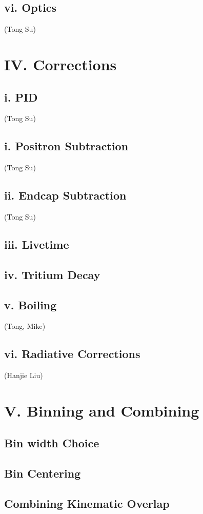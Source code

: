 \documentclass[letterpaper,aps,prl,superscriptaddress,floatfix,twocolumn]{revtex4}
\begin{document}
 \subsection{vi. Optics}
 (Tong Su)
 

\section{IV. Corrections}

 \subsection{i. PID}
 (Tong Su)
 

 \subsection{i. Positron Subtraction}
  (Tong Su)




 \subsection{ii. Endcap Subtraction}
 (Tong Su)

 \subsection{iii. Livetime}

 \subsection{iv. Tritium Decay}
 

 \subsection{v. Boiling}
 (Tong, Mike)

 \subsection{vi. Radiative Corrections}
 (Hanjie Liu)

\section{V. Binning and Combining}

 \subsection{Bin width Choice}

 \subsection{Bin Centering}

 \subsection{Combining Kinematic Overlap}
\end{document}
